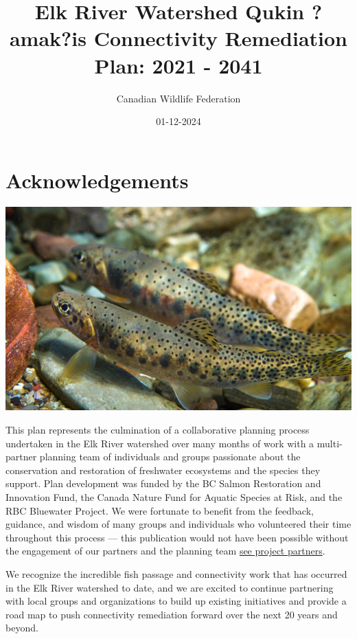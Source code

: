 \documentclass[
  letterpaper,
  DIV=11,
  numbers=noendperiod]{scrreprt}
\title{Elk River Watershed \textbar{} Qukin ?amak?is Connectivity
Remediation Plan: 2021 - 2041}
\author{Canadian Wildlife Federation}
\date{01-12-2024}
\renewcommand*\contentsname{Table of contents}
\newcommand\contentsname{Table of contents}
\begin{document}
\maketitle

\renewcommand*\contentsname{Table of contents}
{
\hypersetup{linkcolor=}
\setcounter{tocdepth}{1}
\tableofcontents
}


\chapter*{Acknowledgements}\label{acknowledgements}


\includegraphics{trout.png}

This plan represents the culmination of a collaborative planning process
undertaken in the Elk River watershed over many months of work with a
multi-partner planning team of individuals and groups passionate about
the conservation and restoration of freshwater ecosystems and the
species they support. Plan development was funded by the BC Salmon
Restoration and Innovation Fund, the Canada Nature Fund for Aquatic
Species at Risk, and the RBC Bluewater Project. We were fortunate to
benefit from the feedback, guidance, and wisdom of many groups and
individuals who volunteered their time throughout this process --- this
publication would not have been possible without the engagement of our
partners and the planning team \href{project-partners.qmd}{see project
partners}.

We recognize the incredible fish passage and connectivity work that has
occurred in the Elk River watershed to date, and we are excited to
continue partnering with local groups and organizations to build up
existing initiatives and provide a road map to push connectivity
remediation forward over the next 20 years and beyond.
\end{document}
